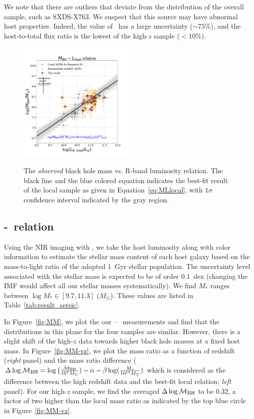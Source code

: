 \documentclass[apj]{emulateapj}
\begin{document}
We note that there are outliers that deviate from the distribution of the overall sample, such as SXDS-X763. We suspect that this source may have abnormal host properties. Indeed, the value of \Reff\ has a large uncertainty ($\sim 75\%$), and the host-to-total flux ratio is the lowest of the high-$z$ sample ($<10\%$). 

\begin{figure}
\centering
{\includegraphics[width=0.5\textwidth]{fig/MBH-L_obs.pdf}}
\caption{\label{fig:ML} 
The {\it observed} black hole mass vs. R-band luminosity relation. The black line and the blue colored equation indicates the best-fit result of the local sample as given in Equation~\ref{eq:MLlocal}, with $1\sigma$ confidence interval indicated by the gray region.
}
\end{figure} 

\subsection{\mbh-\smass\ relation}\label{sec:mm}

Using the NIR imaging with \hst, we take the host luminosity along with color information to estimate the stellar mass content of each host galaxy based on the mass-to-light ratio of the adopted  $1$~Gyr stellar population. The uncertainty level associated with the stellar mass is expected to be of order $0.1$~dex (changing the IMF would affect all our stellar masses systematically). We find $M_*$ ranges between $\log M_* \in [9.7, 11.3]$ ($M_{\odot}$). These values are listed in Table~\ref{tab:result_sersic}. 

In Figure~\ref{fig:MM}, we plot the our \mbh -- \smass\ measurements and find that the distributions in this plane for the four samples are similar. However, there is a slight shift of the high-$z$ data towards higher black hole masses at a fixed host mass. In Figure~\ref{fig:MM-vz}, we plot the mass ratio as a function of redshift ({\it right} panel) and the mass ratio difference ($\Delta \log \mathcal M_{\rm BH} = \log \big( \frac{\mathcal M_{\rm  BH}}{10^{7}M_{\odot}}) -\alpha-\beta\log(\frac{M_*}{10^{10}M_{\odot}})$ which is considered as the difference between the high redshift data and the best-fit local relation; {\it left} panel). For our high-$z$ sample, we find the averaged $\Delta \log \mathcal M_{\rm BH}$ to be $0.32$, a factor of two higher than the local mass ratio as indicated by the top blue circle in Figure~\ref{fig:MM-vz}.
\end{document}
